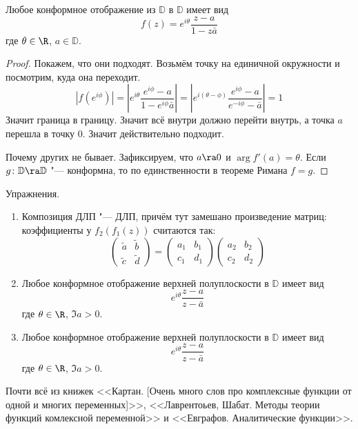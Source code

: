 \begin{theorem}
	Любое конформное отображение из $\mathbb D$ в $\mathbb D$ имеет вид
	\[ f(z) = e^{i\theta} \frac{z-a}{1-z\bar a} \]
	где $\theta \in \R$, $a \in \mathbb D$.
\end{theorem}
\begin{proof}
	Покажем, что они подходят.
	Возьмём точку на единичной окружности и посмотрим, куда она переходит.
	\[ 
		\left| f(e^{i\phi}) \right|
		= \left| e^{i\theta} \frac{e^{i\phi} - a}{1-e^{i\phi}\bar a} \right|
		= \left| e^{i(\theta - \phi)} \frac{e^{i\phi} - a}{e^{-i\phi} - \bar a}\right|
		= 1
	\]
	Значит граница в границу. Значит всё внутри должно перейти внутрь, а точка $a$ перешла в точку $0$.
	Значит действительно подходит.

	Почему других не бывает. Зафиксируем, что $a \ra 0$ и $\arg f'(a) = \theta$.
	Если $g \colon \mathbb D \ra \mathbb D$ "--- конформна, то по единственности в теореме Римана $f = g$.
\end{proof}

Упражнения.
\begin{enumerate}
\item
	Композиция ДЛП "--- ДЛП, причём тут замешано произведение матриц: коэффициенты у $f_2(f_1(z))$ считаются так:
	\[
		\begin{pmatrix} \tilde a & \tilde b \\ \tilde c & \tilde d \end{pmatrix}
		= \begin{pmatrix} a_1 & b_1 \\ c_1 & d_1 \end{pmatrix}
		\begin{pmatrix} a_2 & b_2 \\ c_2 & d_2 \end{pmatrix}
	\]

\item
	Любое конформное отображение верхней полуплоскости в $\mathbb D$ имеет вид
	\[ e^{i\theta} \frac{z-a}{z-\bar a} \]
	где $\theta \in \R$, $\Im a > 0$.
\item
	Любое конформное отображение верхней полуплоскости в $\mathbb D$ имеет вид
	\[ e^{i\theta} \frac{z-a}{z-\bar a} \]
	где $\theta \in \R$, $\Im a > 0$.
\end{enumerate}

Почти всё из книжек
<<Картан. [Очень много слов про комплексные функции от одной и многих переменных]>>,
<<Лаврентоьев, Шабат. Методы теории функций комлексной переменной>>
и <<Евграфов. Аналитические функции>>.

